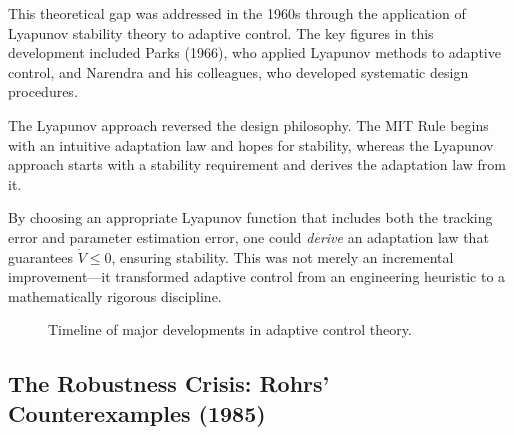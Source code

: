 This theoretical gap was addressed in the 1960s through the application of Lyapunov stability theory to adaptive control. The key figures in this development included Parks (1966), who applied Lyapunov methods to adaptive control, and Narendra and his colleagues, who developed systematic design procedures.

The Lyapunov approach reversed the design philosophy. The MIT Rule begins with an intuitive adaptation law and hopes for stability, whereas the Lyapunov approach starts with a stability requirement and derives the adaptation law from it.

By choosing an appropriate Lyapunov function that includes both the tracking error and parameter estimation error, one could \textit{derive} an adaptation law that guarantees $\dot{V} \leq 0$, ensuring stability. This was not merely an incremental improvement---it transformed adaptive control from an engineering heuristic to a mathematically rigorous discipline.

\begin{figure}[H]
\centering
{}
\caption{Timeline of major developments in adaptive control theory.}
\label{fig:timeline}
\end{figure}

\subsection{The Robustness Crisis: Rohrs' Counterexamples (1985)}

